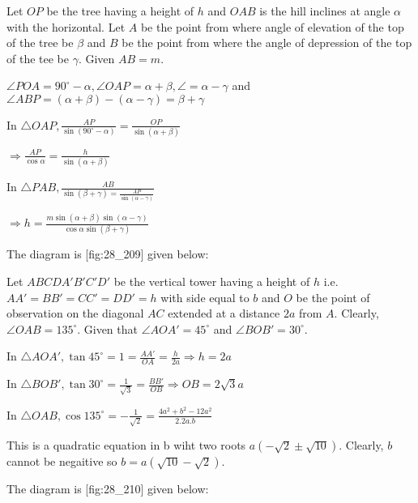   \startplacefigure[reference=fig:28_208]
    \externalfigure[28_208.pdf]
  \stopplacefigure

  Let $OP$ be the tree having a height of $h$ and $OAB$ is the hill inclines at angle
  $\alpha$ with the horizontal. Let $A$ be the point from where angle of elevation of the top
  of the tree be $\beta$ and $B$ be the point from where the angle of depression of the top
  of the tee be $\gamma$. Given $AB = m$.

  $\angle POA = 90^\circ - \alpha, \angle OAP = \alpha + \beta, \angle = \alpha - \gamma$ and
  $\angle ABP = (\alpha + \beta) - (\alpha - \gamma) = \beta + \gamma$

  In $\triangle OAP, \frac{AP}{\sin(90^\circ - \alpha)} = \frac{OP}{\sin(\alpha + \beta)}$

  $\Rightarrow \frac{AP}{\cos\alpha} = \frac{h}{\sin(\alpha + \beta)}$

  In $\triangle PAB, \frac{AB}{\sin(\beta + \gamma) = \frac{AP}{\sin(\alpha - \gamma)}}$

  $\Rightarrow h = \frac{m\sin(\alpha + \beta)\sin(\alpha - \gamma)}{\cos\alpha\sin(\beta + \gamma)}$

\item The diagram is [fig:28_209] given below:

  \startplacefigure[reference=fig:28_209]
    \externalfigure[28_209.pdf]
  \stopplacefigure

  Let $ABCDA'B'C'D'$ be the vertical tower having a height of $h$ i.e. $AA' = BB' = CC'
  = DD' = h$ with side equal to $b$ and $O$ be the point of observation on the diagonal
  $AC$ extended at a distance $2a$ from $A$. Clearly, $\angle OAB =
  135^\circ$. Given that $\angle AOA' = 45^\circ$ and $\angle BOB' = 30^\circ$.

  In $\triangle AOA', \tan45^\circ = 1 = \frac{AA'}{OA} = \frac{h}{2a}\Rightarrow h = 2a$

  In $\triangle BOB', \tan30^\circ = \frac{1}{\sqrt{3}} = \frac{BB'}{OB} \Rightarrow OB =
  2\sqrt{3}a$

  In $\triangle OAB, \cos135^\circ = -\frac{1}{\sqrt{2}} = \frac{4a^2 + b^2 - 12a^2}{2.2a.b}$

  This is a quadratic equation in b wiht two roots $a(-\sqrt{2}\pm\sqrt{10})$. Clearly, $b$
  cannot be negaitive so $b = a(\sqrt{10} - \sqrt{2})$.

\item The diagram is [fig:28_210] given below:

  \startplacefigure[reference=fig:28_210]
    \externalfigure[28_210.pdf]
  \stopplacefigure

